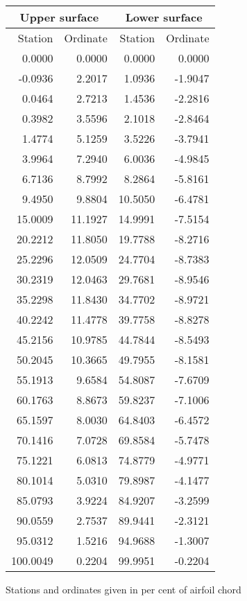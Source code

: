 \documentclass[11pt]{book}
\begin{document}
 \hspace{4mm}
 \begin{tabular}{|r|r|r|r|} \hline 
 \multicolumn{2}{|c|}{Upper surface} & \multicolumn{2}{|c|}{Lower surface} \\
 \hline
 Station & Ordinate & Station & Ordinate \\
 \hline
0.0000 & 0.0000 & 0.0000 & 0.0000 \\
-0.0936 & 2.2017 & 1.0936 & -1.9047 \\
0.0464 & 2.7213 & 1.4536 & -2.2816 \\
0.3982 & 3.5596 & 2.1018 & -2.8464 \\
1.4774 & 5.1259 & 3.5226 & -3.7941 \\
3.9964 & 7.2940 & 6.0036 & -4.9845 \\
6.7136 & 8.7992 & 8.2864 & -5.8161 \\
9.4950 & 9.8804 & 10.5050 & -6.4781 \\
15.0009 & 11.1927 & 14.9991 & -7.5154 \\
20.2212 & 11.8050 & 19.7788 & -8.2716 \\
25.2296 & 12.0509 & 24.7704 & -8.7383 \\
30.2319 & 12.0463 & 29.7681 & -8.9546 \\
35.2298 & 11.8430 & 34.7702 & -8.9721 \\
40.2242 & 11.4778 & 39.7758 & -8.8278 \\
45.2156 & 10.9785 & 44.7844 & -8.5493 \\
50.2045 & 10.3665 & 49.7955 & -8.1581 \\
55.1913 & 9.6584 & 54.8087 & -7.6709 \\
60.1763 & 8.8673 & 59.8237 & -7.1006 \\
65.1597 & 8.0030 & 64.8403 & -6.4572 \\
70.1416 & 7.0728 & 69.8584 & -5.7478 \\
75.1221 & 6.0813 & 74.8779 & -4.9771 \\
80.1014 & 5.0310 & 79.8987 & -4.1477 \\
85.0793 & 3.9224 & 84.9207 & -3.2599 \\
90.0559 & 2.7537 & 89.9441 & -2.3121 \\
95.0312 & 1.5216 & 94.9688 & -1.3007 \\
100.0049 & 0.2204 & 99.9951 & -0.2204 \\
 \hline 
 \end{tabular}
 \vspace{8mm}

Stations and ordinates given in per cent of airfoil chord
\end{document}
